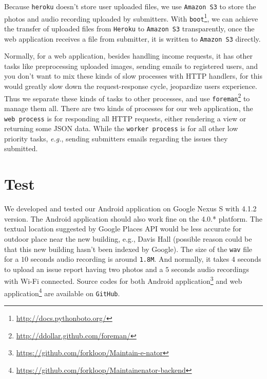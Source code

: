 \documentclass{acm_proc_article-sp}
\begin{document}
Because \texttt{heroku} doesn't store user uploaded files, we use \texttt{Amazon S3} to store the photos and audio recording uploaded by submitters.
With \texttt{boot}\footnote{\url{http://docs.pythonboto.org/}}, we can achieve the transfer of uploaded files from \texttt{Heroku} to \texttt{Amazon S3}
transparently, once the web application receives a file from submitter, it is written to \texttt{Amazon S3} directly.

Normally, for a web application, besides handling income requests, it has other tasks like preprocessing uploaded images, sending emails to registered users,
and you don't want to mix these kinds of slow processes with HTTP handlers, for this would greatly slow down the request-response cycle, jeopardize users
experience. Thus we separate these kinds of tasks to other processes,
and use \texttt{foreman}\footnote{\url{http://ddollar.github.com/foreman/}} to manage them all.
There are two kinds of processes for our web application, the \texttt{web process} is for responding all HTTP requests, either rendering a view or
returning some JSON data. While the \texttt{worker process} is for all other low priority tasks, \textit{e.g.}, sending submitters emails regarding the issues they
submitted.

\section{Test}
We developed and tested our Android application on Google Nexus S with 4.1.2 version. The Android application should also work fine on the
4.0.* platform. The textual location suggested by Google Places API would be less accurate for outdoor place near the new building, e.g., Davis Hall
(possible reason could be that this new building hasn't been indexed by Google).
The size of the \texttt{wav} file for a $10$ seconds audio recording is around \texttt{1.8M}.
And normally, it takes $4$ seconds to upload an issue report having two photos and a $5$ seconds audio recordings with Wi-Fi connected.
Source codes for both Android application\footnote{\url{https://github.com/forkloop/Maintain-e-nator}} and
web application\footnote{\url{https://github.com/forkloop/Maintainenator-backend}} are available on \texttt{GitHub}.

\end{document}
